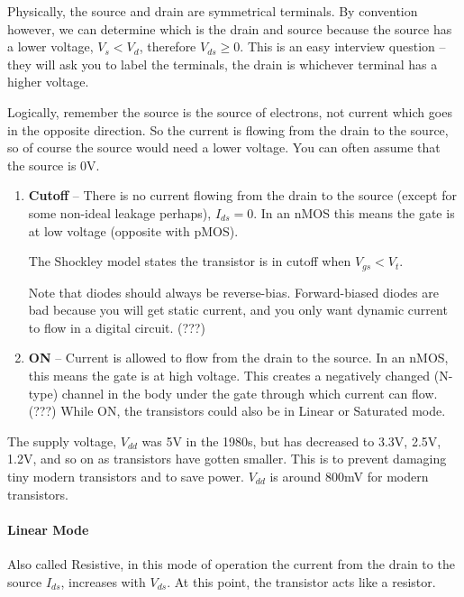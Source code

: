 \documentclass{article}
\begin{document}
Physically, the source and drain are symmetrical terminals. By convention however, we can determine which is the drain and source because the source has a lower voltage, $V_s < V_d$, therefore $V_{ds} \ge 0$. This is an easy interview question -- they will ask you to label the terminals, the drain is whichever terminal has a higher voltage.

Logically, remember the source is the source of electrons, not current which goes in the opposite direction. So the current is flowing from the drain to the source, so of course the source would need a  lower voltage. You can often assume that the source  is 0V. 

\begin{enumerate}
\item \textbf{Cutoff} -- There is no current flowing from the drain to the source (except for some non-ideal leakage perhaps), $I_{ds} = 0$. In an nMOS this means the gate is at low voltage (opposite with pMOS).

The Shockley model states the transistor is in cutoff when $V_{gs}<V_{t}$.


Note that diodes should always be reverse-bias. Forward-biased diodes are bad because you will get static current, and you only want dynamic current to flow in a digital circuit. (???)

\item \textbf{ON} -- Current is allowed to flow from the drain to the source. In an nMOS, this means the gate is at high voltage. This creates a negatively changed (N-type) channel in the body under the gate through which current can flow. (???) While ON, the transistors could also be in Linear or Saturated mode.

\end{enumerate}

The supply voltage, $V_{dd}$ was 5V in the 1980s, but has decreased to 3.3V, 2.5V, 1.2V, and so on as transistors have gotten smaller. This is to prevent damaging tiny modern transistors and to save power. $V_{dd}$ is around 800mV for modern transistors.


\paragraph{Linear Mode}

Also called Resistive, in this mode of operation the current from the drain to the source $I_{ds}$, increases with $V_{ds}$. At this point, the transistor acts like a resistor. 
\end{document}

